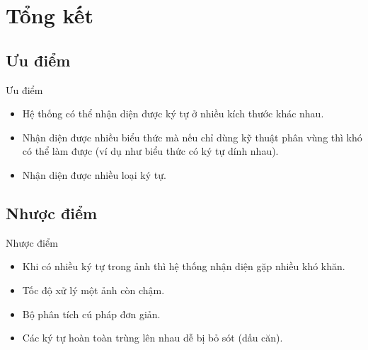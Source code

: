 \documentclass{beamer}
\begin{document}
	\section{Tổng kết}
	\subsection{Ưu điểm}
	\begin{frame}{Ưu điểm}
			\begin{itemize}
			\item Hệ thống có thể nhận diện được ký tự ở nhiều kích thước khác nhau.
			\item Nhận diện được nhiều biểu thức mà nếu chỉ dùng kỹ thuật phân vùng thì khó có thể làm được (ví dụ như biểu thức có ký tự dính nhau).
			\item Nhận diện được nhiều loại ký tự.
		\end{itemize}
	\end{frame}
	\subsection{Nhược điểm}
	\begin{frame}{Nhược điểm}
		\begin{itemize}
			\item Khi có nhiều ký tự trong ảnh thì hệ thống nhận diện gặp nhiều khó khăn.
			\item Tốc độ xử lý một ảnh còn chậm.
			\item Bộ phân tích cú pháp đơn giản.
			\item Các ký tự hoàn toàn trùng lên nhau dễ bị bỏ sót (dấu căn).
		\end{itemize}
	\end{frame}
	
\end{document}
